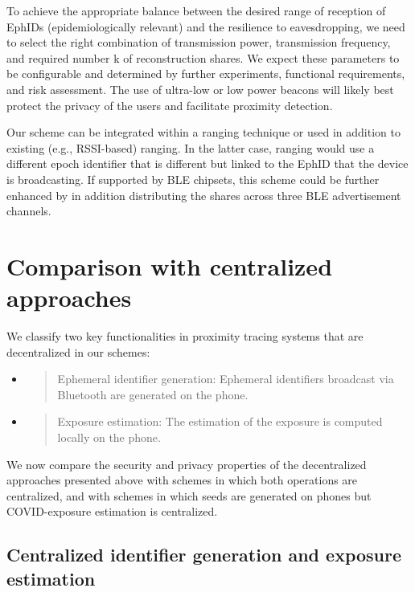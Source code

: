 \documentclass{article}
\begin{document}
To achieve the appropriate balance between the desired range of
reception of EphIDs (epidemiologically relevant) and the resilience to
eavesdropping, we need to select the right combination of transmission
power, transmission frequency, and required number k of reconstruction
shares. We expect these parameters to be configurable and determined by
further experiments, functional requirements, and risk assessment. The
use of ultra-low or low power beacons will likely best protect the
privacy of the users and facilitate proximity detection.

Our scheme can be integrated within a ranging technique or used in
addition to existing (e.g., RSSI-based) ranging. In the latter case,
ranging would use a different epoch identifier that is different but
linked to the EphID that the device is broadcasting. If supported by BLE
chipsets, this scheme could be further enhanced by in addition
distributing the shares across three BLE advertisement channels.

\hypertarget{comparison-with-centralized-approaches}{%
\section{Comparison with centralized
approaches}\label{comparison-with-centralized-approaches}}

We classify two key functionalities in proximity tracing systems that
are decentralized in our schemes:

\begin{itemize}
\item
  \begin{quote}
  Ephemeral identifier generation: Ephemeral identifiers broadcast via
  Bluetooth are generated on the phone.
  \end{quote}
\item
  \begin{quote}
  Exposure estimation: The estimation of the exposure is computed
  locally on the phone.
  \end{quote}
\end{itemize}

We now compare the security and privacy properties of the decentralized
approaches presented above with schemes in which both operations are
centralized, and with schemes in which seeds are generated on phones but
COVID-exposure estimation is centralized.

\subsection{Centralized identifier generation and exposure
estimation}\label{centralized-identifier-generation-and-exposure-estimation}
\end{document}
